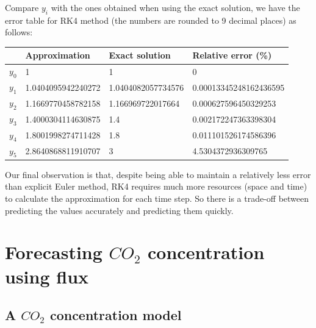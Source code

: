 \documentclass[a4paper]{article}
\begin{document}
Compare \(y_i\) with the ones obtained when using the exact solution, we have the error table for RK4 method (the numbers are rounded to 9 decimal places) as follows:

\begin{table}[h]
  \centering
  \begin{tabular}{|l|l|l|l|}
    \hline
            & Approximation      & Exact solution     & Relative error (\%)    \\
    \hline
    \(y_0\) & 1                  & 1                  & 0                      \\
    \hline
    \(y_1\) & 1.0404095942240272 & 1.0404082057734576 & 0.00013345248162436595 \\
    \hline
    \(y_2\) & 1.1669770458782158 & 1.166969722017664  & 0.000627596450329253   \\
    \hline
    \(y_3\) & 1.4000304114630875 & 1.4                & 0.002172247363398304   \\
    \hline
    \(y_4\) & 1.8001998274711428 & 1.8                & 0.011101526174586396   \\
    \hline
    \(y_5\) & 2.8640868811910707 & 3                  & 4.5304372936309765     \\
    \hline
  \end{tabular}
\end{table}

Our final observation is that, despite being able to maintain a relatively less error than explicit Euler method, RK4 requires much more resources (space and time) to calculate the approximation for each time step. So there is a trade-off between predicting the values accurately and predicting them quickly.

\newpage
\section{Forecasting \(CO_2\) concentration using flux}
\subsection{A \(CO_2\) concentration model}
\end{document}
